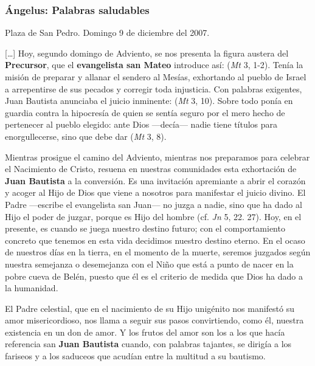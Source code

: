 \subsubsection{Ángelus: Palabras saludables}

Plaza de San Pedro. Domingo 9 de diciembre del 2007.

[\ldots{}] Hoy, segundo domingo de Adviento, se nos presenta la figura austera del \textbf{Precursor}, que el \textbf{evangelista san Mateo} introduce así:  (\emph{Mt} 3, 1-2). Tenía la misión de preparar y allanar el sendero al Mesías, exhortando al pueblo de Israel a arrepentirse de sus pecados y corregir toda injusticia. Con palabras exigentes, Juan Bautista anunciaba el juicio inminente:  (\emph{Mt} 3, 10). Sobre todo ponía en guardia contra la hipocresía de quien se sentía seguro por el mero hecho de pertenecer al pueblo elegido: ante Dios ---decía--- nadie tiene títulos para enorgullecerse, sino que debe dar  (\emph{Mt} 3, 8).

Mientras prosigue el camino del Adviento, mientras nos preparamos para celebrar el Nacimiento de Cristo, resuena en nuestras comunidades esta exhortación de \textbf{Juan Bautista} a la conversión. Es una invitación apremiante a abrir el corazón y acoger al Hijo de Dios que viene a nosotros para manifestar el juicio divino. El Padre ---escribe el evangelista san Juan--- no juzga a nadie, sino que ha dado al Hijo el poder de juzgar, porque es Hijo del hombre (cf. \emph{Jn} 5, 22. 27). Hoy, en el presente, es cuando se juega nuestro destino futuro; con el comportamiento concreto que tenemos en esta vida decidimos nuestro destino eterno. En el ocaso de nuestros días en la tierra, en el momento de la muerte, seremos juzgados según nuestra semejanza o desemejanza con el Niño que está a punto de nacer en la pobre cueva de Belén, puesto que él es el criterio de medida que Dios ha dado a la humanidad.

El Padre celestial, que en el nacimiento de su Hijo unigénito nos manifestó su amor misericordioso, nos llama a seguir sus pasos convirtiendo, como él, nuestra existencia en un don de amor. Y los frutos del amor son los  a los que hacía referencia san \textbf{Juan Bautista} cuando, con palabras tajantes, se dirigía a los fariseos y a los saduceos que acudían entre la multitud a su bautismo.


